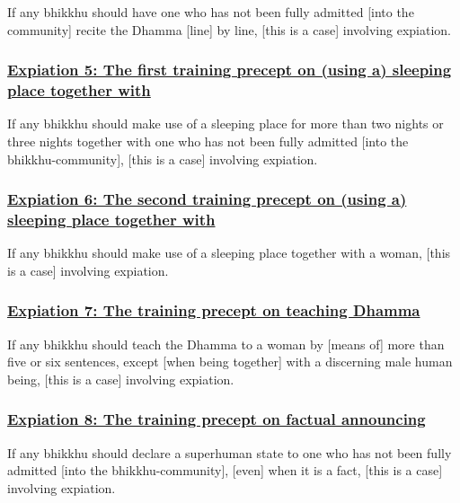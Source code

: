 If any bhikkhu should have one who has not been fully admitted [into the community] recite the Dhamma [line] by line, [this is a case] involving expiation.



\subsubsection*{\hyperref[pac5]{Expiation 5: The first training precept on (using a) sleeping place together with}}
\label{exp5}

If any bhikkhu should make use of a sleeping place for more than two nights or three nights together with one who has not been fully admitted [into the bhikkhu-community], [this is a case] involving expiation.



\subsubsection*{\hyperref[pac6]{Expiation 6: The second training precept on (using a) sleeping place together with}}
\label{exp6}

If any bhikkhu should make use of a sleeping place together with a woman, [this is a case] involving expiation.



\subsubsection*{\hyperref[pac7]{Expiation 7: The training precept on teaching Dhamma}}
\label{exp7}

If any bhikkhu should teach the Dhamma to a woman by [means of] more than five or six sentences, except [when being together] with a discerning male human being, [this is a case] involving expiation.



\subsubsection*{\hyperref[pac8]{Expiation 8: The training precept on factual announcing}}
\label{exp8}

If any bhikkhu should declare a superhuman state to one who has not been fully admitted [into the bhikkhu-community], [even] when it is a fact, [this is a case] involving expiation.



